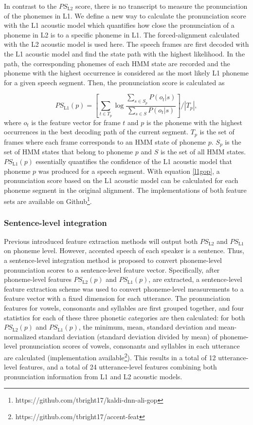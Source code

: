 In contrast to the $PS_{\mathrm{L2}}$ score, there is no transcript to measure the pronunciation of the phonemes in L1. We define a new way to calculate the pronunciation score with the L1 acoustic model which quantifies how close the pronunciation of a phoneme in L2 is to a specific phoneme in L1. The forced-alignment calculated with the L2 acoustic model is used here. The speech frames are first decoded with the L1 acoustic model and find the state path with the highest likelihood. In the path, the corresponding phonemes of each HMM state are recorded and the phoneme with the highest occurrence is considered as the most likely L1 phoneme for a given speech segment. Then, the pronunciation score is calculated as

\begin{equation}
\label{l1gop}
PS_{\mathrm{L1}}(p) = \left [ \sum_{t \in T_p} \log \frac{ \sum_{s \in S_p}P(o_t|s)}  { \sum_{s \in S}P(o_t|s)} \right ] /\left | T_p \right |,
\end{equation}
where $o_t$ is the feature vector for frame $t$ and $p$ is the phoneme with the highest occurrences in the best decoding path of the current segment. $T_p$ is the set of frames where each frame corresponds to an HMM state of phoneme $p$. $S_p$ is the set of HMM states that belong to phoneme $p$ and $S$ is the set of all HMM states. $PS_{\mathrm{L1}}(p)$ essentially quantifies the confidence of the L1 acoustic model that phoneme $p$ was produced for a speech segment. With equation \ref{l1gop}, a pronunciation score based on the L1 acoustic model can be calculated for each phoneme segment in the original alignment. The implementations of both feature sets are available on Github\footnote{https://github.com/tbright17/kaldi-dnn-ali-gop}.

\subsubsection{Sentence-level integration}

Previous introduced feature extraction methods will output both $PS_{\mathrm{L2}}$ and $PS_{\mathrm{L1}}$ on phoneme level. However, accented speech of each speaker is a sentence. Thus, a sentence-level integration method is proposed to convert phoneme-level pronunciation scores to a sentence-level feature vector. Specifically, after phoneme-level features $PS_{\mathrm{L2}}(p)$ and $PS_{\mathrm{L1}}(p)$, are extracted, a sentence-level feature extraction scheme was used to convert phoneme-level measurements to a feature vector with a fixed dimension for each utterance. The pronunciation features for vowels, consonants and syllables are first grouped together, and four statistics for each of these three phonetic categories are then calculated: for both $PS_{\mathrm{L2}}(p)$ and $PS_{\mathrm{L1}}(p)$, the minimum, mean, standard deviation and mean-normalized standard deviation (standard deviation divided by mean) of phoneme-level pronunciation scores of vowels, consonants and syllables in each utterance are calculated (implementation available\footnote{https://github.com/tbright17/accent-feat}). This results in a total of 12 utterance-level features, and a total of 24 utterance-level features combining both pronunciation information from L1 and L2 acoustic models.


